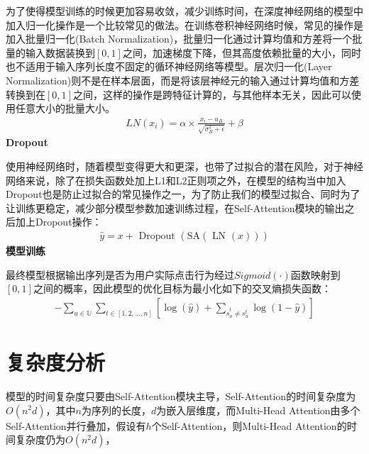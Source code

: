 为了使得模型训练的时候更加容易收敛，减少训练时间，在深度神经网络的模型中加入归一化操作是一个比较常见的做法。在训练卷积神经网络时候，常见的操作是加入批量归一化(Batch Normalization)，批量归一化通过计算均值和方差将一个批量的输入数据装换到$[0,1]$之间，加速梯度下降，但其高度依赖批量的大小，同时也不适用于输入序列长度不固定的循环神经网络等模型。层次归一化(Layer Normalization)则不是在样本层面，而是将该层神经元的输入通过计算均值和方差转换到在$[0,1]$之间，这样的操作是跨特征计算的，与其他样本无关，因此可以使用任意大小的批量大小。
\begin{align}
	LN(x_i)=\alpha\times\frac{x_i-u_B}{\sqrt{\sigma_B^2+\epsilon}}+\beta
\end{align}
\textbf{Dropout}

使用神经网络时，随着模型变得更大和更深，也带了过拟合的潜在风险，对于神经网络来说，除了在损失函数处加上L1和L2正则项之外，在模型的结构当中加入Dropout也是防止过拟合的常见操作之一，为了防止我们的模型过拟合、同时为了让训练更稳定，减少部分模型参数加速训练过程，在Self-Attention模块的输出之后加上Dropout操作：
\begin{align}
	\hat{y}=x+\text { Dropout }(\text {SA}(\text { LN }(x)))
\end{align}
\textbf{模型训练}

最终模型根据输出序列是否为用户实际点击行为经过$Sigmoid(\cdot )$函数映射到$[0,1]$之间的概率，因此模型的优化目标为最小化如下的交叉熵损失函数：
\begin{align}
-\sum_{{u} \in \mathbb{U}} \sum_{t \in[1,2, \ldots, n]}\left[\log (\hat{y})+\sum_{\hat{s}_{u}^{t}\neq s_{u}^{t}} \log (1-\hat{y})\right]
\end{align}


\section{复杂度分析}

模型的时间复杂度只要由Self-Attention模块主导，Self-Attention的时间复杂度为$O(n^{2} d)$，其中$n$为序列的长度，$d$为嵌入层维度，而Multi-Head Attention由多个Self-Attention并行叠加，假设有$h$个Self-Attention，则Multi-Head Attention的时间复杂度仍为$O(n^{2} d)$，




